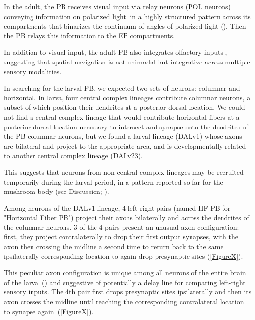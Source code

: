 \documentclass{article}
\begin{document}
In the adult, the PB receives visual input via relay neurons (POL neurons) conveying information on polarized light, in a highly structured pattern across its compartments that binarizes the continuum of angles of polarized light (\citep{heinze2009transformation}). Then the PB relays this information to the EB compartments.

In addition to visual input, the adult PB also integrates olfactory inputs \citep{hulse2021connectome}, suggesting that spatial navigation is not unimodal but integrative across multiple sensory modalities.

In searching for the larval PB, we expected two sets of neurons: columnar and horizontal. In larva, four central complex lineages contribute columnar neurons, a subset of which position their dendrites at a posterior-dorsal location. We could not find a central complex lineage that would contribute horizontal fibers at a posterior-dorsal location necessary to intersect and synapse onto the dendrites of the PB columnar neurons, but we found a larval lineage (DALv1) whose axons are bilateral and project to the appropriate area, and is developmentally related to another central complex lineage (DALv23).

This suggests that neurons from non-central complex lineages may be recruited temporarily during the larval period, in a pattern reported so far for the mushroom body (see Discussion; \citep{truman2023metamorphosis}). 





Among neurons of the DALv1 lineage, 4 left-right pairs (named HF-PB for "Horizontal Fiber PB") project their axons bilaterally and across the dendrites of the columnar neurons.
3 of the 4 pairs present an unusual axon configuration: first, they project contralaterally to drop their first output synapses, with the axon then crossing the midline a second time to return back to the same ipsilaterally corresponding location to again drop presynaptic sites (\ref{FigureX}).

This peculiar axon configuration is unique among all neurons of the entire brain of the larva~(\citep{winding2023}) and suggestive of potentially a delay line for comparing left-right sensory inputs.
The 4th pair first drops presynaptic sites ipsilaterally and then its axon crosses the midline until reaching the corresponding contralateral location to synapse again~(\ref{FigureX}).
\end{document}
